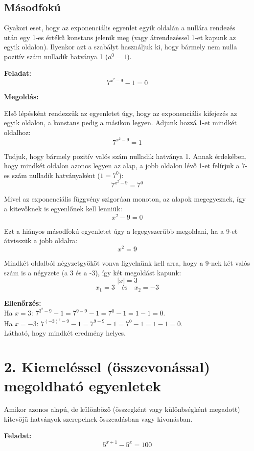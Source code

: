 \documentclass[11pt, a4paper]{article}
\begin{document}
\subsection*{Másodfokú}
Gyakori eset, hogy az exponenciális egyenlet egyik oldalán a nullára rendezés után egy 1-es értékű konstans jelenik meg (vagy átrendezéssel 1-et kapunk az egyik oldalon). Ilyenkor azt a szabályt használjuk ki, hogy bármely nem nulla pozitív szám nulladik hatványa 1 ($a^0 = 1$). 

\textbf{Feladat:}
\[ 7^{x^2 - 9} - 1 = 0 \]

\textbf{Megoldás:}

Első lépésként rendezzük az egyenletet úgy, hogy az exponenciális kifejezés az egyik oldalon, a konstans pedig a másikon legyen. Adjunk hozzá 1-et mindkét oldalhoz:
\[ 7^{x^2 - 9} = 1 \]

Tudjuk, hogy bármely pozitív valós szám nulladik hatványa 1. Annak érdekében, hogy mindkét oldalon azonos legyen az alap, a jobb oldalon lévő 1-et felírjuk a 7-es szám nulladik hatványaként ($1 = 7^0$):
\[ 7^{x^2 - 9} = 7^0 \]

Mivel az exponenciális függvény szigorúan monoton, az alapok megegyeznek, így a kitevőknek is egyenlőnek kell lenniük:
\[ x^2 - 9 = 0 \]

Ezt a hiányos másodfokú egyenletet úgy a legegyszerűbb megoldani, ha a 9-et átvisszük a jobb oldalra:
\[ x^2 = 9 \]

Mindkét oldalból négyzetgyököt vonva figyelnünk kell arra, hogy a 9-nek két valós szám is a négyzete (a 3 és a -3), így két megoldást kapunk:
\[ |x| = 3 \]
\[ x_1 = 3 \quad \text{és} \quad x_2 = -3 \]

\textbf{Ellenőrzés:} \\
Ha $x = 3$: $7^{3^2 - 9} - 1 = 7^{9 - 9} - 1 = 7^0 - 1 = 1 - 1 = 0$. \\
Ha $x = -3$: $7^{(-3)^2 - 9} - 1 = 7^{9 - 9} - 1 = 7^0 - 1 = 1 - 1 = 0$. \\
Látható, hogy mindkét eredmény helyes.



\section*{2. Kiemeléssel (összevonással) megoldható egyenletek}
Amikor azonos alapú, de különböző (összegként vagy különbségként megadott) kitevőjű hatványok szerepelnek összeadásban vagy kivonásban.

\textbf{Feladat:}
\[ 5^{x+1} - 5^x = 100 \]
\end{document}
